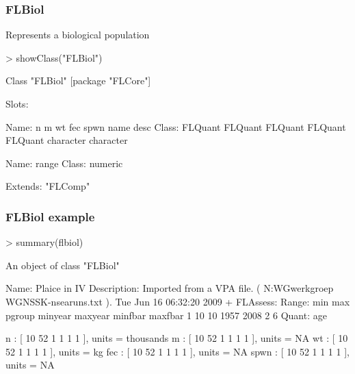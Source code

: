 \documentclass{beamer}%
\begin{document}
\begin{frame}[containsverbatim]
  \frametitle{FLBiol}
Represents a biological population
{\tiny{
\begin{Schunk}
\begin{Sinput}
> showClass("FLBiol")
\end{Sinput}
\begin{Soutput}
Class "FLBiol" [package "FLCore"]

Slots:
                                                                            
Name:          n         m        wt       fec      spwn      name      desc
Class:   FLQuant   FLQuant   FLQuant   FLQuant   FLQuant character character
                
Name:      range
Class:   numeric

Extends: "FLComp"
\end{Soutput}
\end{Schunk}
}}

\end{frame}

\begin{frame}[containsverbatim]
  \frametitle{FLBiol example}
{\tiny{
\begin{Schunk}
\begin{Sinput}
> summary(flbiol)
\end{Sinput}
\begin{Soutput}
An object of class "FLBiol"

Name: Plaice in IV 
Description: Imported from a VPA file. ( N:\Projecten\ICES WG\Demersale werkgroep WGNSSK\stock\ple-nsea\final runs\index.txt ).  Tue Jun 16 06:32:20 2009 + FLAssess:  
Range:	 min	max	pgroup	minyear	maxyear	minfbar	maxfbar 
	1	10	10	1957	2008	2	6	
Quant: age 

n             : [ 10 52 1 1 1 1 ], units =  thousands 
m             : [ 10 52 1 1 1 1 ], units =  NA 
wt            : [ 10 52 1 1 1 1 ], units =  kg 
fec           : [ 10 52 1 1 1 1 ], units =  NA 
spwn          : [ 10 52 1 1 1 1 ], units =  NA 
\end{Soutput}
\end{Schunk}
}}
\end{frame}
\end{document}
